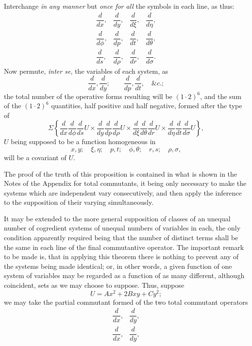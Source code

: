 \documentclass[11pt]{article}
\newcommand{\sourcepage}[1]{\marginpar{\scriptsize p.~#1}}
\begin{document}
\sourcepage{319}
Interchange \emph{in any manner} but \emph{once for all} the symbols in each line, as thus:
\[
\begin{array}{cccc}
\dfrac{d}{dx},&\dfrac{d}{dy},&\dfrac{d}{d\xi},&\dfrac{d}{d\eta},\\[0.6em]
\dfrac{d}{d\phi},&\dfrac{d}{dp},&\dfrac{d}{dt},&\dfrac{d}{d\theta},\\[0.6em]
\dfrac{d}{ds},&\dfrac{d}{d\rho},&\dfrac{d}{dr},&\dfrac{d}{d\sigma}.
\end{array}
\]
Now permute, \emph{inter se}, the variables of each system, as
\[
\frac{d}{dx},\frac{d}{dy};\qquad \frac{d}{dp},\frac{d}{dt},\quad \&c.;
\]
the total number of the operative forms resulting will be $(1\cdot2)^6$, and the sum of the $(1\cdot2)^6$ quantities, half positive and half negative, formed after the type of
\[
\Sigma\left\{
\frac{d}{dx}\frac{d}{d\phi}\frac{d}{ds}U\times
\frac{d}{dy}\frac{d}{dp}\frac{d}{d\rho}U
\times
\frac{d}{d\xi}\frac{d}{d\theta}\frac{d}{dr}U\times
\frac{d}{d\eta}\frac{d}{dt}\frac{d}{d\sigma}U
\right\},
\]
$U$ being supposed to be a function homogeneous in
\[
x,y;\quad \xi,\eta;\quad p,t;\quad \phi,\theta;\quad r,s;\quad \rho,\sigma,
\]
will be a covariant of $U$.

The proof of the truth of this proposition is contained in what is shown in the Notes of the Appendix for total commutants, it being only necessary to make the systems which are independent vary consecutively, and then apply the inference to the supposition of their varying simultaneously.

It may be extended to the more general supposition of classes of an unequal number of cogredient systems of unequal numbers of variables in each, the only condition apparently required being that the number of distinct terms shall be the same in each line of the final commutantive operator. The important remark to be made is, that in applying this theorem there is nothing to prevent any of the systems being made identical; or, in other words, a given function of one system of variables may be regarded as a function of as many different, although coincident, sets as we may choose to suppose. Thus, suppose
\[
U=Ax^2+2Bxy+Cy^2;
\]
we may take the partial commutant formed of the two total commutant operators
\[
\begin{array}{cc}
\dfrac{d}{dx},&\dfrac{d}{dy},\\[0.6em]
\dfrac{d}{dx},&\dfrac{d}{dy},
\end{array}
\]
\end{document}

